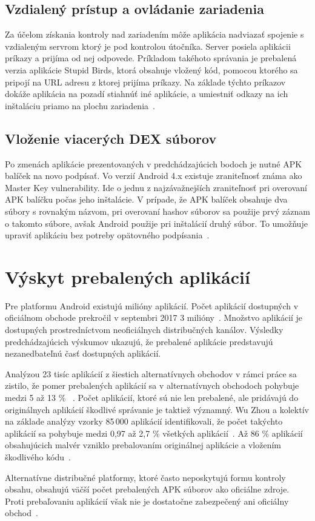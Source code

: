 \subsection*{Vzdialený prístup a ovládanie zariadenia}
Za účelom získania kontroly nad zariadením môže aplikácia nadviazať spojenie s vzdialeným servrom ktorý je pod kontrolou útočníka. Server posiela aplikácii príkazy a prijíma od nej odpovede. Príkladom takéhoto správania je prebalená verzia aplikácie Stupid Birds, ktorá obsahuje vložený kód, pomocou ktorého sa pripojí na URL adresu z ktorej prijíma príkazy. Na základe týchto príkazov dokáže aplikácia na pozadí stiahnúť iné aplikácie, a umiestniť odkazy na ich inštaláciu priamo na plochu zariadenia~\cite{fakeapps}. 

\subsection*{Vloženie viacerých DEX súborov}
Po zmenách aplikácie prezentovaných v predchádzajúcich bodoch je nutné APK balíček na novo podpísať. Vo verzií Android 4.x existuje zraniteľnosť známa ako Master Key vulnerability. Ide o jednu z najzávažnejších zraniteľnosť pri overovaní APK balíčku počas jeho inštalácie. V prípade, že APK balíček obsahuje dva súbory s rovnakým názvom, pri overovaní hashov súborov sa použije prvý záznam o takomto súbore, avšak Android použije pri inštalácií druhý súbor. To umožňuje upraviť aplikáciu bez potreby opätovného podpísania~\cite{c2gYRVCI9leJhfOJ}. 

\section{Výskyt prebalených aplikácií}
Pre platformu Android existujú milióny aplikácií. Počet aplikácií dostupných v oficiálnom obchode  prekročil v septembri 2017 3 milióny~\cite{Statista}. Množstvo aplikácií je dostupných prostredníctvom neoficiálnych distribučných kanálov.  Výsledky predchádzajúcich výskumov ukazujú, že prebalené aplikácie predstavujú nezanedbateľnú časť dostupných aplikácií.

Analýzou 23 tisíc aplikácií z šiestich alternatívnych obchodov v rámci práce  sa zistilo, že pomer prebalených aplikácií sa v alternatívnych obchodoch pohybuje medzi 5 až 13 \% ~\cite{DetectingRepackagedZhou}.
Počet aplikácií, ktoré sú nie len prebalené, ale pridávajú do originálnych aplikácií škodlivé správanie je taktiež významný. Wu Zhou a kolektív na základe analýzy vzorky 85\,000 aplikácií identifikovali, že počet takýchto aplikácií sa pohybuje medzi 0,97 až 2,7 \% všetkých aplikácií~\cite{Zhou2013}.
Až 86 \% aplikácií obsahujúcich malvér vzniklo prebalovaním originálnej aplikácie a vložením škodlivého kódu~\cite{androidThreats}.

Alternatívne distribučné platformy, ktoré často neposkytujú formu kontroly obsahu, obsahujú väčší počet prebalených APK súborov ako oficiálne zdroje. Proti prebaľovaniu aplikácií však nie je dostatočne zabezpečený ani oficiálny obchod~\cite{Zhauniarovich2013}. 
